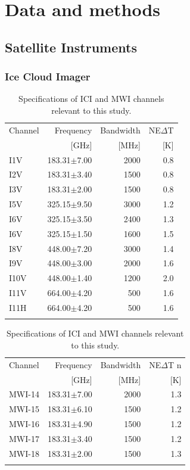 \documentclass[amt, manuscript]{copernicus}
\begin{document}
\section{Data and methods}
%
\subsection{Satellite Instruments}
\subsubsection{Ice Cloud Imager}
%
\begin{table}[t]	
	\caption{Specifications of ICI and MWI channels relevant to this study.}
	\label{tab:ICI_MWI_channels}
	\begin{tabular}{lrrr}
		\tophline
		Channel & Frequency 	& Bandwidth  	&NE$\Delta$T	\\
				& [GHz]			& [MHz]			& [K]			\\
		\middlehline
		I1V&	183.31$\pm$7.00    & 2000 			& 0.8 		\\
		I2V&	183.31$\pm$3.40    & 1500 			& 0.8 		\\
		I3V&	183.31$\pm$2.00    & 1500			& 0.8 		\\
		I5V&	325.15$\pm$9.50    & 3000			& 1.2 		\\
		I6V&	325.15$\pm$3.50    & 2400			& 1.3 		\\
		I6V&	325.15$\pm$1.50    & 1600			& 1.5 		\\
		I8V&	448.00$\pm$7.20    & 3000			& 1.4 		\\
		I9V&	448.00$\pm$3.00    & 2000			& 1.6 		\\
		I10V&	448.00$\pm$1.40    & 1200			& 2.0 		\\
		I11V&	664.00$\pm$4.20    & \phantom{0}500	& 1.6 		\\
		I11H&	664.00$\pm$4.20    & \phantom{0}500 & 1.6 		\\		
		\bottomhline
	\end{tabular}
	\begin{tabular}{lrrr}
		\tophline
		Channel & Frequency 	& Bandwidth  	&NE$\Delta$T	n\\
				& [GHz]			& [MHz]			& [K]			\\
		\middlehline
		MWI-14&	183.31$\pm$7.00    & 2000 			& 1.3 		\\
		MWI-15&	183.31$\pm$6.10    & 1500			& 1.2 		\\
		MWI-16&	183.31$\pm$4.90    & 1500			& 1.2 		\\
		MWI-17&	183.31$\pm$3.40    & 1500			& 1.2 		\\
		MWI-18&	183.31$\pm$2.00    & 1500			& 1.3 		\\	
		\bottomhline
	\end{tabular}

	\belowtable{} %
\end{table}
\end{document}
